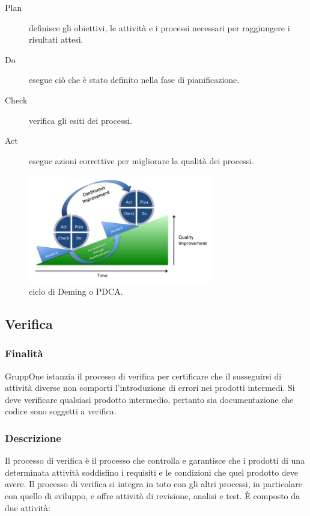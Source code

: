 \documentclass[../norme-di-progetto.tex]{subfiles}
\begin{document}
\begin{description}
  \item [Plan] definisce gli obiettivi, le attività e i processi necessari per raggiungere i risultati attesi.
  \item [Do] esegue ciò che è stato definito nella fase di pianificazione.
  \item [Check] verifica gli esiti dei processi.
  \item [Act] esegue azioni correttive per migliorare la qualità dei processi.
\end{description}
\begin{figure}[H]
  \includegraphics[width=8cm]{PDCA-process.png}
  \centering
  \caption{ciclo di Deming o PDCA.}
\end{figure}

\subsection{Verifica}%
\label{sub:verifica}

\subsubsection{Finalità}%
\label{subs:verifica/finalita}

GruppOne istanzia il processo di verifica per certificare che il susseguirsi di attività diverse non comporti l'introduzione di errori nei prodotti intermedi.
Si deve verificare qualsiasi prodotto intermedio, pertanto sia documentazione che codice sono soggetti a verifica.

\subsubsection{Descrizione}%
\label{subs:verifica/descrizione}


Il processo di verifica è il processo che controlla e garantisce che i prodotti di una determinata attività soddisfino i requisiti e le condizioni che quel prodotto deve avere. Il processo di verifica si integra in toto con gli altri processi, in particolare con quello di sviluppo, e offre attività di revisione, analisi e test. È composto da due attività:
\end{document}
